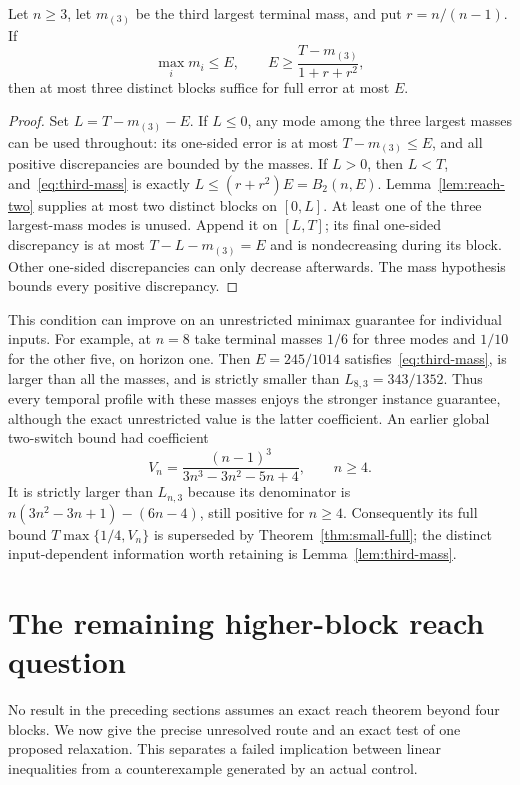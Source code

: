 \begin{lemma}
\label{lem:third-mass}
Let $n\ge3$, let $m_{(3)}$ be the third largest terminal mass, and put
$r=n/(n-1)$. If
\begin{equation}\label{eq:third-mass}
 \max_i m_i\le E,\qquad
 E\ge\frac{T-m_{(3)}}{1+r+r^2},
\end{equation}
then at most three distinct blocks suffice for full error at most $E$.
\end{lemma}
\begin{proof}
Set $L=T-m_{(3)}-E$. If $L\le0$, any mode among the three largest
masses can be used throughout: its one-sided error is at most
$T-m_{(3)}\le E$, and all positive discrepancies are bounded by the
masses. If $L>0$, then $L<T$, and~\eqref{eq:third-mass} is exactly
$L\le(r+r^2)E=B_2(n,E)$. Lemma~\ref{lem:reach-two} supplies at most
two distinct blocks on $[0,L]$. At least one of the three largest-mass
modes is unused. Append it on $[L,T]$; its final one-sided discrepancy
is at most $T-L-m_{(3)}=E$ and is nondecreasing during its block.
Other one-sided discrepancies can only decrease afterwards. The mass
hypothesis bounds every positive discrepancy.
\end{proof}

This condition can improve on an unrestricted minimax guarantee for
individual inputs. For example, at $n=8$ take terminal masses $1/6$
for three modes and $1/10$ for the other five, on horizon one. Then
$E=245/1014$ satisfies~\eqref{eq:third-mass}, is larger than all the
masses, and is strictly smaller than $L_{8,3}=343/1352$.
Thus every temporal profile with these masses enjoys the stronger
instance guarantee, although the exact unrestricted value is the latter
coefficient. An earlier global two-switch bound had coefficient
\[
 V_n=\frac{(n-1)^3}{3n^3-3n^2-5n+4},\qquad n\ge4.
\]
It is strictly larger than $L_{n,3}$ because its denominator is
$n(3n^2-3n+1)-(6n-4)$, still positive for $n\ge4$.
Consequently its full bound $T\max\{1/4,V_n\}$ is superseded by
Theorem~\ref{thm:small-full}; the distinct input-dependent information
worth retaining is Lemma~\ref{lem:third-mass}.

\section{The remaining higher-block reach question}\label{sec:higher-reach}

No result in the preceding sections assumes an exact reach theorem beyond
four blocks. We now give the precise unresolved route and an exact test
of one proposed relaxation. This separates a failed implication between
linear inequalities from a counterexample generated by an actual control.


